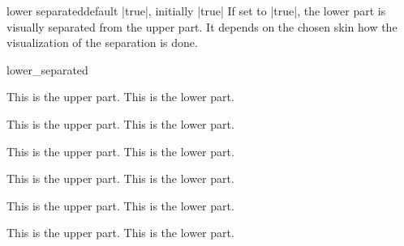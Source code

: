 \clearpage
\begin{docTcbKey}{lower separated}{}{default |true|, initially |true|}
If set to |true|, the lower part is visually separated from the upper part.
It depends on the chosen skin how the visualization of the separation is done.
\enlargethispage*{1cm}
\begin{exdispExample}{lower_separated}
\begin{tcbraster}[colback=red!5!white,colframe=red!75!black,
  fonttitle=\bfseries,fontlower=\itshape]
%
\begin{tcolorbox}[title=Lower separated]
This is the upper part.
\tcblower
This is the lower part.
\end{tcolorbox}
%
\begin{tcolorbox}[title=Lower not separated,lower separated=false]
This is the upper part.
\tcblower
This is the lower part.
\end{tcolorbox}
%
\begin{tcolorbox}[sidebyside,title=Lower separated]
This is the upper part.
\tcblower
This is the lower part.
\end{tcolorbox}
%
\begin{tcolorbox}[sidebyside,title=Lower not separated,lower separated=false]
This is the upper part.
\tcblower
This is the lower part.
\end{tcolorbox}
%
\begin{tcolorbox}[beamer,title=Lower separated]
This is the upper part.
\tcblower
This is the lower part.
\end{tcolorbox}
%
\begin{tcolorbox}[beamer,title=Lower not separated,lower separated=false]
This is the upper part.
\tcblower
This is the lower part.
\end{tcolorbox}
%
\end{tcbraster}
\end{exdispExample}
\end{docTcbKey}


